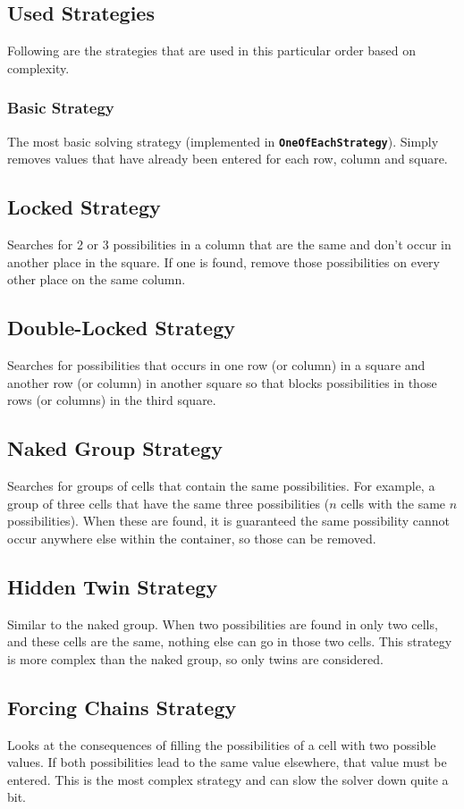 \documentclass[11pt, a4paper, fleqn]{article}
\newcommand{\class}[1]{{\color{class}\textbf{\lstinline{#1}}}}
\begin{document}
\subsection{Used Strategies}
Following are the strategies that are used in this particular order based on complexity.
\subsubsection{Basic Strategy}
The most basic solving strategy (implemented in \class{OneOfEachStrategy}). Simply removes
values that have already been entered for each row, column and square.
\subsection{Locked Strategy}
Searches for 2 or 3 possibilities in a column that are the same and don't 
occur in another place in the square. If one is found, remove those possibilities on 
every other place on the same column.
\subsection{Double-Locked Strategy}
Searches for possibilities that occurs in one row (or column) in a square
and another row (or column) in another square so that blocks possibilities
in those rows (or columns) in the third square.
\subsection{Naked Group Strategy}
Searches for groups of cells that contain the same possibilities. For example,
a group of three cells that have the same three possibilities ($n$ cells with the same $n$ possibilities). 
When these are found, it is guaranteed the same possibility cannot occur anywhere else within the container,
so those can be removed.
\subsection{Hidden Twin Strategy}
Similar to the naked group. When two possibilities are found in only two cells, and these cells are the same,
nothing else can go in those two cells. This strategy is more complex than the naked group, so only twins are
considered.
\subsection{Forcing Chains Strategy}
Looks at the consequences of filling the possibilities of a cell with two possible values.
If both possibilities lead to the same value elsewhere, that value must be entered. This is the most
complex strategy and can slow the solver down quite a bit.
\end{document}
